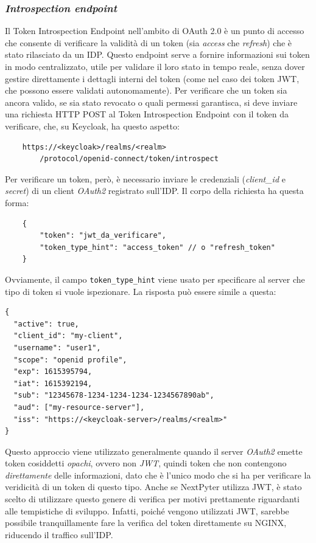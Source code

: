 \subsubsection{\textit{Introspection endpoint}}
Il Token Introspection Endpoint nell'ambito di OAuth 2.0 è un punto di accesso che consente di verificare la validità di un token (sia \textit{access} che \textit{refresh}) che è stato rilasciato da un IDP. Questo endpoint serve a fornire informazioni sui token in modo centralizzato, utile per validare il loro stato in tempo reale, senza dover gestire direttamente i dettagli interni del token (come nel caso dei token JWT, che possono essere validati autonomamente).
\newline
Per verificare che un token sia ancora valido, se sia stato revocato o quali permessi garantisca, si deve inviare una richiesta HTTP POST al Token Introspection Endpoint con il token da verificare, che, su Keycloak, ha questo aspetto:
\begin{verbatim}
    https://<keycloak>/realms/<realm>
        /protocol/openid-connect/token/introspect
\end{verbatim}
Per verificare un token, però, è necessario inviare le credenziali (\textit{client\_id} e \textit{secret}) di un client \textit{OAuth2} registrato sull'IDP.
\newline
Il corpo della richiesta ha questa forma:
\begin{verbatim}
    {
        "token": "jwt_da_verificare",
        "token_type_hint": "access_token" // o "refresh_token"
    }
\end{verbatim}
Ovviamente, il campo \verb|token_type_hint| viene usato per specificare al server che tipo di token si vuole ispezionare.
\newline
La risposta può essere simile a questa:
\begin{verbatim}
{
  "active": true,
  "client_id": "my-client",
  "username": "user1",
  "scope": "openid profile",
  "exp": 1615395794,
  "iat": 1615392194,
  "sub": "12345678-1234-1234-1234-1234567890ab",
  "aud": ["my-resource-server"],
  "iss": "https://<keycloak-server>/realms/<realm>"
}
\end{verbatim}
Questo approccio viene utilizzato generalmente quando il server \textit{OAuth2} emette token cosiddetti \textit{opachi}, ovvero non \textit{JWT}, quindi token che non contengono \textit{direttamente} delle informazioni, dato che è l'unico modo che si ha per verificare la veridicità di un token di questo tipo.
\newline
Anche se NextPyter utilizza JWT, è stato scelto di utilizzare questo genere di verifica per motivi prettamente riguardanti alle tempistiche di sviluppo. Infatti, poiché vengono utilizzati JWT, sarebbe possibile tranquillamente fare la verifica del token direttamente su NGINX, riducendo il traffico sull'IDP.
